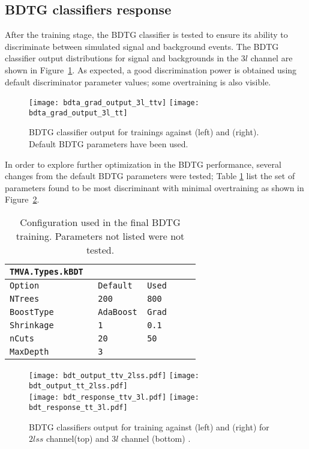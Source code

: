\subsection{BDTG classifiers response}

After the training stage, the BDTG classifier is tested to ensure its ability to discriminate between simulated signal and background events. The BDTG classifier output distributions for signal and backgrounds in the $3l$ channel are shown in Figure~\ref{fig:bdtg_output_default}. As expected, a good discrimination power is obtained using default discriminator parameter values; some overtraining is also visible.

\begin{figure} [!h]
  \centering
   \texttt{[image: bdta\_grad\_output\_3l\_ttv]}
   \texttt{[image: bdta\_grad\_output\_3l\_tt]}
\caption[BDTG classifier response. Default parameters.]{BDTG classifier output for trainings against \ttV (left) and \ttbar(right). Default BDTG  parameters have been used.}
\label{fig:bdtg_output_default}
\end{figure}

In order to explore further optimization in the BDTG performance, several changes from the default BDTG parameters were tested; Table \ref{tab:bdtsettings} list the set of parameters found to be most discriminant with minimal overtraining as shown in Figure~\ref{fig:output_2lss}.  

\begin{table} [!h]
\centering
\begin{tabular}{lll}\hline
  \verb|TMVA.Types.kBDT                  | \\\hline
  \verb|Option            Default   Used |\\
  \verb|NTrees            200       800  |\\
  \verb|BoostType         AdaBoost  Grad | \\
  \verb|Shrinkage         1         0.1  | \\ 
  \verb|nCuts             20        50   | \\
  \verb|MaxDepth          3              | \\ \hline
\end{tabular}
\caption[Configuration used in the final BDTG training.]{Configuration used in the final BDTG training. Parameters not listed were not tested.}\label{tab:bdtsettings}
\end{table}

\begin{figure} [!h]
  \centering
   \texttt{[image: bdt\_output\_ttv\_2lss.pdf]}
   \texttt{[image: bdt\_output\_tt\_2lss.pdf]}\\
   \texttt{[image: bdt\_response\_ttv\_3l.pdf]}
   \texttt{[image: bdt\_response\_tt\_3l.pdf]}
\caption[BDTG classifier output.]{BDTG classifiers output for training against \ttV (left) and \ttbar(right) for $2lss$ channel(top) and $3l$ channel (bottom) .}
\label{fig:output_2lss}
\end{figure}

